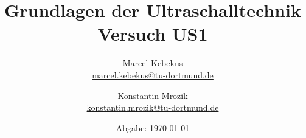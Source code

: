

\title{Grundlagen der Ultraschalltechnik\\
\small{Versuch US1}
}
\author{%
  Marcel Kebekus\\%
  \href{mailto:marcel.kebekus@tu-dortmund.de}{marcel.kebekus@tu-dortmund.de} \and
  Konstantin Mrozik\\
  \href{mailto:konstantin.mrozik@tu-dortmund.de}{konstantin.mrozik@tu-dortmund.de}%
}
\date{%
  Abgabe: \today %
}
\publishers{TU Dortmund – Fakultät Physik}
\makeatletter         
\def\@maketitle{
\raggedright
\texttt{[image: bilder/lo\_TU-Do 2008/logo\_rgb\_jpg]}\\[8ex]
\begin{center}
{\Huge \bfseries \sffamily \@title }\\[4ex] 
{\Large  \@author}\\[4ex] 
\@date\\[8ex]
\publishers\\
\end{center}}
\makeatother





\maketitle
\thispagestyle{empty}
\tableofcontents
\newpage


\newpage


\newpage
\nocite{*}
\printbibliography
%




